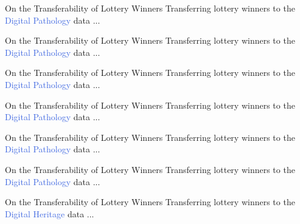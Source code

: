 \documentclass{beamer}
\begin{document}
\begin{frame}{On the Transferability of Lottery Winners}
	Transferring lottery winners to the \textcolor{RoyalBlue}{Digital Pathology} data ...
	

\end{frame}

\begin{frame}{On the Transferability of Lottery Winners}
	Transferring lottery winners to the \textcolor{RoyalBlue}{Digital Pathology} data ...
	
\end{frame}


\begin{frame}{On the Transferability of Lottery Winners}
		Transferring lottery winners to the \textcolor{RoyalBlue}{Digital Pathology} data ...

\end{frame}


\begin{frame}{On the Transferability of Lottery Winners}
		Transferring lottery winners to the \textcolor{RoyalBlue}{Digital Pathology} data ...

\end{frame}


\begin{frame}{On the Transferability of Lottery Winners}
		Transferring lottery winners to the \textcolor{RoyalBlue}{Digital Pathology} data ...

\end{frame}

\begin{frame}{On the Transferability of Lottery Winners}
	Transferring lottery winners to the \textcolor{RoyalBlue}{Digital Pathology} data ...
	
\end{frame}

\begin{frame}{On the Transferability of Lottery Winners}
	Transferring lottery winners to the \textcolor{RoyalBlue}{Digital Heritage} data ...
	
\end{frame}
\end{document}
